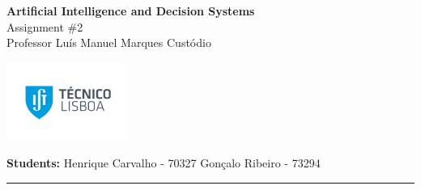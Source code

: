 \documentclass[12pt,a4paper]{article}
\begin{document}

\begin{minipage}{0.8\textwidth}
\Large \textbf{Artificial Intelligence and Decision Systems}\vspace{0.2cm}\\
Assignment \#2\vspace{0.2cm}\\
\normalsize Professor Luís Manuel Marques Custódio
\end{minipage}
\begin{minipage}{0\textwidth}
\raggedleft
\includegraphics[scale=0.65]{ist_logo.png}
\end{minipage}

\vspace{0.2cm}
\begin{minipage}{0.8\textwidth}
\textbf{Students:} \hspace{0.3cm}
Henrique Carvalho - 70327 \hspace{0.3cm} Gonçalo Ribeiro -  73294

\end{minipage}

\rule{\textwidth}{1pt}
\end{document}
